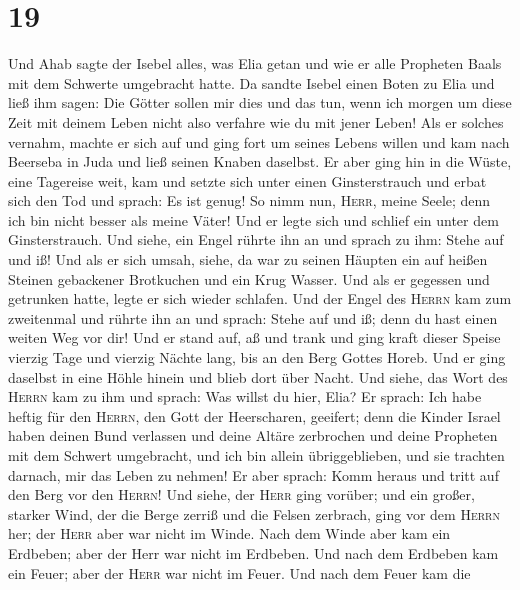\hypertarget{section-18}{%
\section{19}\label{section-18}}

 Und Ahab sagte der Isebel alles, was Elia getan und wie
er alle Propheten Baals mit dem Schwerte umgebracht hatte.
 Da sandte Isebel einen Boten zu Elia und ließ ihm sagen:
Die Götter sollen mir dies und das tun, wenn ich morgen um diese Zeit
mit deinem Leben nicht also verfahre wie du mit jener Leben!
 Als er solches vernahm, machte er sich auf und ging fort
um seines Lebens willen und kam nach Beerseba in Juda und ließ seinen
Knaben daselbst.  Er aber ging hin in die Wüste, eine
Tagereise weit, kam und setzte sich unter einen Ginsterstrauch und erbat
sich den Tod und sprach: Es ist genug! So nimm nun, \textsc{Herr}, meine
Seele; denn ich bin nicht besser als meine Väter!  Und er
legte sich und schlief ein unter dem Ginsterstrauch. Und siehe, ein
Engel rührte ihn an und sprach zu ihm: Stehe auf und iß! 
Und als er sich umsah, siehe, da war zu seinen Häupten ein auf heißen
Steinen gebackener Brotkuchen und ein Krug Wasser. Und als er gegessen
und getrunken hatte, legte er sich wieder schlafen.  Und
der Engel des \textsc{Herrn} kam zum zweitenmal und rührte ihn an und
sprach: Stehe auf und iß; denn du hast einen weiten Weg vor dir!
 Und er stand auf, aß und trank und ging kraft dieser
Speise vierzig Tage und vierzig Nächte lang, bis an den Berg Gottes
Horeb.  Und er ging daselbst in eine Höhle hinein und
blieb dort über Nacht. Und siehe, das Wort des \textsc{Herrn} kam zu ihm
und sprach: Was willst du hier, Elia?  Er sprach: Ich
habe heftig für den \textsc{Herrn}, den Gott der Heerscharen, geeifert;
denn die Kinder Israel haben deinen Bund verlassen und deine Altäre
zerbrochen und deine Propheten mit dem Schwert umgebracht, und ich bin
allein übriggeblieben, und sie trachten darnach, mir das Leben zu
nehmen!  Er aber sprach: Komm heraus und tritt auf den
Berg vor den \textsc{Herrn}! Und siehe, der \textsc{Herr} ging vorüber;
und ein großer, starker Wind, der die Berge zerriß und die Felsen
zerbrach, ging vor dem \textsc{Herrn} her; der \textsc{Herr} aber war
nicht im Winde. Nach dem Winde aber kam ein Erdbeben; aber der Herr war
nicht im Erdbeben.  Und nach dem Erdbeben kam ein Feuer;
aber der \textsc{Herr} war nicht im Feuer. Und nach dem Feuer kam die
